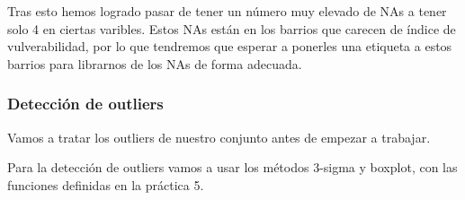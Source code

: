 \documentclass[notspecified,article,submit,moreauthors,pdftex]{Definitions/mdpi}
\begin{document}
Tras esto hemos logrado pasar de tener un número muy elevado de NAs a
tener solo 4 en ciertas varibles. Estos NAs están en los barrios que
carecen de índice de vulverabilidad, por lo que tendremos que esperar a
ponerles una etiqueta a estos barrios para librarnos de los NAs de forma
adecuada.

\hypertarget{detecciuxf3n-de-outliers}{%
\subsubsection{Detección de outliers}\label{detecciuxf3n-de-outliers}}

Vamos a tratar los outliers de nuestro conjunto antes de empezar a
trabajar.

Para la detección de outliers vamos a usar los métodos 3-sigma y
boxplot, con las funciones definidas en la práctica 5.
\end{document}
